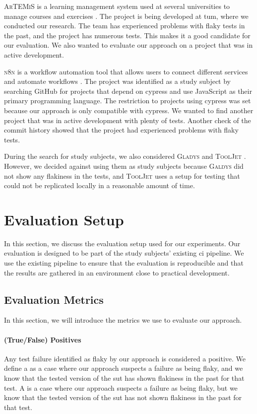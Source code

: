 \textsc{ArTEMiS} is a learning management system used at several universities to manage courses and exercises \autocite{krusche_artemis_2018}.
The project is being developed at \ac{tum}, where we conducted our research.
The team has experienced problems with flaky tests in the past, and the project has numerous tests.
This makes it a good candidate for our evaluation.
We also wanted to evaluate our approach on a project that was in active development.

\textsc{n8n} is a workflow automation tool that allows users to connect different services and automate workflows \autocite{noauthor_n8n_2023}.
The project was identified as a study subject by searching GitHub for projects that depend on cypress and use JavaScript as their primary programming language.
The restriction to projects using cypress was set because our approach is only compatible with cypress.
We wanted to find another project that was in active development with plenty of tests.
Another check of the commit history showed that the project had experienced problems with flaky tests.

During the search for study subjects, we also considered \textsc{Gladys} \autocite{noauthor_gladys_2023} and \textsc{ToolJet} \autocite{noauthor_tooljettooljet_2023}. However, we decided against using them as study subjects because \textsc{Galdys} did not show any flakiness in the tests, and \textsc{ToolJet} uses a setup for testing that could not be replicated locally in a reasonable amount of time.

\section{Evaluation Setup}
In this section, we discuss the evaluation setup used for our experiments.
Our evaluation is designed to be part of the study subjects' existing \ac{ci} pipeline.
We use the existing pipeline to ensure that the evaluation is reproducible and that the results are gathered in an environment close to practical development.

\subsection{Evaluation Metrics}
In this section, we will introduce the metrics we use to evaluate our approach.

\paragraph{(True/False) Positives} Any test failure identified as flaky by our approach is considered a positive.
We define a  as a case where our approach suspects a failure as being flaky, and we know that the tested version of the \ac{sut} has shown flakiness in the past for that test.
A  is a case where our approach suspects a failure as being flaky, but we know that the tested version of the \ac{sut} has not shown flakiness in the past for that test.

